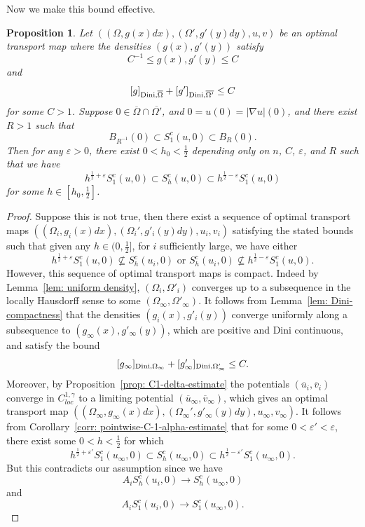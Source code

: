 \documentclass[12pt,reqno]{amsart}
\newtheorem{prop}{Proposition}[section]
\newcommand{\eps}{\varepsilon}
\numberwithin{equation}{section}
\begin{document}
        Now we make this bound effective. 
        \begin{prop}\label{prop: effective-almost-C-1-1-eps}
            Let $((\Omega, g(x)dx), (\Omega', g'(y)dy), u, v)$ be an optimal transport map where the densities $(g(x), g'(y))$ satisfy
	    \[C^{-1}\leq g(x), g'(y)\leq C\]
    	   and
	    \[[g]_{{\rm Dini}, \overline{\Omega}}+     [g']_{{\rm Dini}, \overline{\Omega'}}\leq C\]
            for some $C>1$. Suppose $0\in\overline\Omega\cap\overline{\Omega'}$, and $0 = u(0) = |\nabla u|(0)$, and there exist $R>1$ such that 
            \begin{equation}
                B_{R^{-1}}(0)\subset S^c_1(u, 0)\subset B_{R}(0). 
            \end{equation}
            Then for any $\eps>0$, there exist $0<h_0<\frac 1 2$ depending only on $n$, $C$, $\eps$, and $R$ such that we have
            \[h^{\frac{1}{2}+\eps}S_1^c(u, 0)\subset S^c_h(u, 0)\subset h^{\frac 1 2-\eps}S_1^c(u, 0)\]
            for some $h\in [h_0, \frac 1 2]$. 
        \end{prop}
        \begin{proof}
            \sloppy Suppose this is not true, then there exist a sequence of optimal transport maps $((\Omega_i, g_i(x)dx), (\Omega_i', g'_i(y)dy), u_i, v_i)$ satisfying the stated bounds such that given any $h\in (0, \frac 1 2]$, for $i$ sufficiently large, we have either 
            \[h^{\frac 1 2 +\eps}S_1^c(u, 0)\nsubseteq S^c_h(u_i, 0) \text{ or } S^c_h(u_i, 0) \nsubseteq h^{\frac 1 2-\eps}S_1^c(u, 0).\]
            However, this sequence of optimal transport maps is compact. Indeed by Lemma~\ref{lem: uniform density}, $(\Omega_i, \Omega'_i)$ converges up to a subsequence in the locally Hausdorff sense to some $(\Omega_{\infty}, \Omega'_{\infty})$. It follows from Lemma~\ref{lem: Dini-compactness} that the densities $(g_i(x), g'_i(y))$ converge uniformly along a subsequence to $(g_{\infty}(x), g'_{\infty}(y))$, which are positive and Dini continuous, and satisfy the bound
            \[
            [g_{\infty}]_{{\rm Dini},\Omega_{\infty}} +[g'_{\infty}]_{{\rm Dini},\Omega'_{\infty}} \leq C.
            \]
            Moreover, by Proposition~\ref{prop: C1-delta-estimate} the potentials $(\overline u_i, \overline v_i)$ converge in $C^{1, \gamma}_{loc}$ to a limiting potential $(\overline u_{\infty}, \overline v_{\infty})$, which gives an optimal transport map {$((\Omega_{\infty}, g_{\infty}(x)dx), (\Omega_{\infty}', g'_{\infty}(y)dy), u_{\infty}, v_{\infty})$}. It follows from Corollary~\ref{corr: pointwise-C-1-alpha-estimate} that for some $0<\eps'<\eps$, there exist some $0<h<\frac 1 2$ for which  
            \[h^{\frac 1 2+\eps'}S_1^c(u_{\infty}, 0)\subset S^c_h(u_{\infty}, 0)\subset h^{\frac 1 2 -\eps'}S_1^c(u_{\infty}, 0). \]           
            But this contradicts our assumption since we have 
            \[A_iS_h^c(u_i, 0)\to S_h^c(u_{\infty}, 0)\]
            and 
            \[A_iS_1^c(u_i, 0)\to S_1^c(u_{\infty}, 0).\]
        \end{proof}
\end{document}
